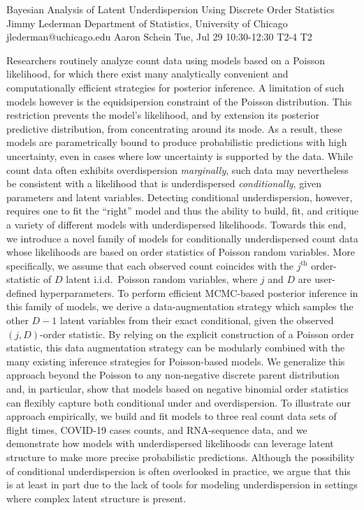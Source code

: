 \begin{talk}
  {Bayesian Analysis of Latent Underdispersion Using Discrete Order Statistics}%
  {Jimmy Lederman}%
  {Department of Statistics, University of Chicago}%
  {jlederman@uchicago.edu}%
  {Aaron Schein}%
  {}%
  {Tue, Jul 29 10:30-12:30}%
  {T2-4}%
  {T2}%
  
				


Researchers routinely analyze count data using models based on a Poisson likelihood, for which there exist many analytically convenient and computationally efficient strategies for posterior inference. A limitation of such models however is the equidsipersion constraint of the Poisson distribution. This restriction prevents the model's likelihood, and by extension its posterior predictive distribution, from concentrating around its mode. As a result, these models are parametrically bound to produce probabilistic predictions with high uncertainty, even in cases where low uncertainty is supported by the data. While count data often exhibits overdispersion \textit{marginally}, such data may nevertheless be consistent with a likelihood that is underdispersed \textit{conditionally}, given parameters and latent variables. Detecting conditional underdispersion, however, requires one to fit the ``right'' model and thus the ability to build, fit, and critique a variety of different models with underdispersed likelihoods. Towards this end, we introduce a novel family of models for conditionally underdispersed count data whose likelihoods are based on order statistics of Poisson random variables. More specifically, we assume that each observed count coincides with the $j^{\textrm{th}}$ order-statistic of $D$ latent i.i.d.~Poisson random variables, where $j$ and $D$ are user-defined hyperparameters. To perform efficient MCMC-based posterior inference in this family of models, we derive a data-augmentation strategy which samples the other $D{-}1$ latent variables from their exact conditional, given the observed $(j,D)$-order statistic. By relying on the explicit construction of a Poisson order statistic, this data augmentation strategy can be modularly combined with the many existing inference strategies for Poisson-based models. We generalize this approach beyond the Poisson to any non-negative discrete parent distribution and, in particular, show that models based on negative binomial order statistics can flexibly capture both conditional under and overdispersion.  To illustrate our approach empirically, we build and fit models to three real count data sets of flight times, COVID-19 cases counts, and RNA-sequence data, and we demonstrate how models with underdispersed likelihoods can leverage latent structure to make more precise probabilistic predictions. Although the possibility of conditional underdispersion is often overlooked in practice, we argue that this is at least in part due to the lack of tools for modeling underdispersion in settings where complex latent structure is present.


\end{talk}
